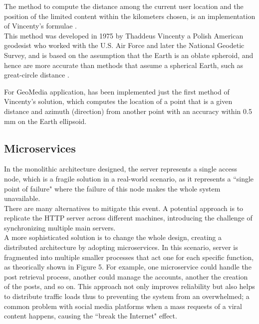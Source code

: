 \documentclass[conference]{IEEEtran}
\begin{document}
The method to compute the distance among the current user location and the position of the limited content within the kilometers chosen, is an implementation of Vincenty's formulae \cite{Vincenty}.
\\
This method was developed in 1975 by Thaddeus Vincenty \cite{ThaddeusVincenty} a Polish American geodesist who worked with the U.S. Air Force and later the National Geodetic Survey, and is based on the assumption that the Earth is an oblate spheroid, and hence are more accurate than methods that assume a spherical Earth, such as great-circle distance \cite{GCDWiki}. 

For GeoMedia application, has been implemented just the first method of Vincenty's solution, which computes the location of a point that is a given distance and azimuth (direction) from another point with an accuracy within 0.5 mm on the Earth ellipsoid.


\subsection{Microservices}
In the monolithic architecture designed, the server represents a single access node, which is a fragile solution in a real-world scenario, as it represents a ``single point of failure" where the failure of this node makes the whole system unavailable.
\\
There are many alternatives to mitigate this event. A potential approach is to replicate the HTTP server across different machines, introducing the challenge of synchronizing multiple main servers.
\\
A more sophisticated solution is to change the whole design, creating a distributed architecture by adopting microservices\cite{b6}. In this scenario, server is fragmented into multiple smaller processes that act one for each specific function, as theorically shown in Figure 5.
For example, one microservice could handle the post retrieval process, another could manage the accounts, another the creation of the posts, and so on. This approach not only improves reliability but also helps to distribute traffic loads thus to preventing the system from an overwhelmed; a common problem with social media platforms when a mass requests of a viral content happens, causing the ``break the Internet" \cite{BreakTheInternet} effect.
\end{document}
